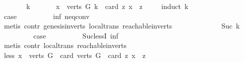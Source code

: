\begin{isabellebody}
\ \isanewline
\ \ \ \ \isamarkupfalse%
\ k\ \isanewline
\ \ \ \ \isamarkupfalse%
\ {\isachardoublequoteopen}{\isasymexists}x\ {\isasymin}\ verts\ G{\isachardot}{\kern0pt}\ k\ {\isacharless}{\kern0pt}\ card\ {\isacharbraceleft}{\kern0pt}z{\isachardot}{\kern0pt}\ x\ {\isasymrightarrow}\isactrlsup {\isacharplus}{\kern0pt}\ z{\isacharbraceright}{\kern0pt}{\isachardoublequoteclose}\isanewline
\ \ \ \ \isamarkupfalse%
{\isacharparenleft}{\kern0pt}induct\ k{\isacharparenright}{\kern0pt}\isanewline
\ \ \ \ \ \ \isamarkupfalse%
\ {}\isanewline
\ \ \ \ \ \ \isamarkupfalse%
\ \isamarkupfalse%
\ {\isacharquery}{\kern0pt}case\isanewline
\ \ \ \ \ \ \ \ \isamarkupfalse%
\ inf\ neq{}{\isacharunderscore}{\kern0pt}conv\isanewline
\ \ \ \ \ \ \ \ \isamarkupfalse%
\ {\isacharparenleft}{\kern0pt}metis\ contr\ genesis{\isacharunderscore}{\kern0pt}in{\isacharunderscore}{\kern0pt}verts\ local{\isachardot}{\kern0pt}trans\ reachable{}{\isacharunderscore}{\kern0pt}in{\isacharunderscore}{\kern0pt}verts{\isacharparenleft}{\kern0pt}{}{\isacharparenright}{\kern0pt}{\isacharparenright}{\kern0pt}\ \isanewline
\ \ \ \ \isamarkupfalse%
\isanewline
\ \ \ \ \ \ \isamarkupfalse%
\ {\isacharparenleft}{\kern0pt}Suc\ k{\isacharparenright}{\kern0pt}\isanewline
\ \ \ \ \ \ \isamarkupfalse%
\ \isamarkupfalse%
\ {\isacharquery}{\kern0pt}case\isanewline
\ \ \ \ \ \ \ \ \isamarkupfalse%
\ Suc{\isacharunderscore}{\kern0pt}lessI\ inf\isanewline
\ \ \ \ \ \ \ \ \isamarkupfalse%
\ {\isacharparenleft}{\kern0pt}metis\ contr\ local{\isachardot}{\kern0pt}trans\ reachable{}{\isacharunderscore}{\kern0pt}in{\isacharunderscore}{\kern0pt}verts{\isacharparenleft}{\kern0pt}{}{\isacharparenright}{\kern0pt}{\isacharparenright}{\kern0pt}\ \isanewline
\ \ \ \ \isamarkupfalse%
\isanewline
\ \ \isamarkupfalse%
\isanewline
\ \ \isamarkupfalse%
\ \isamarkupfalse%
\ less{\isacharcolon}{\kern0pt}\ {\isachardoublequoteopen}{\isasymexists}x\ {\isasymin}\ verts\ G{\isachardot}{\kern0pt}\ \ card\ {\isacharparenleft}{\kern0pt}verts\ G{\isacharparenright}{\kern0pt}\ {\isacharless}{\kern0pt}\ card\ {\isacharbraceleft}{\kern0pt}z{\isachardot}{\kern0pt}\ x\ {\isasymrightarrow}\isactrlsup {\isacharplus}{\kern0pt}\ z{\isacharbraceright}{\kern0pt}{\isachardoublequoteclose}\ \isamarkupfalse%

\end{isabellebody}
